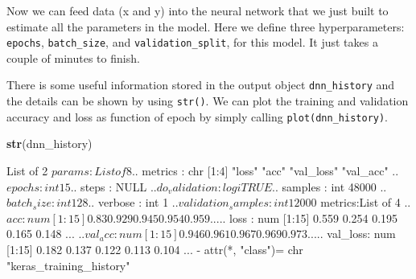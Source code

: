 \documentclass[12pt,]{krantz}
\makeatletter
\newenvironment{Shaded}{\begin{snugshade}}{\end{snugshade}}
\newcommand{\DataTypeTok}[1]{\textcolor[rgb]{0.27,0.27,0.27}{#1}}
\newcommand{\DecValTok}[1]{\textcolor[rgb]{0.06,0.06,0.06}{#1}}
\newcommand{\FloatTok}[1]{\textcolor[rgb]{0.06,0.06,0.06}{#1}}
\newcommand{\KeywordTok}[1]{\textcolor[rgb]{0.27,0.27,0.27}{\textbf{#1}}}
\newcommand{\NormalTok}[1]{#1}
\newcommand{\OperatorTok}[1]{\textcolor[rgb]{0.43,0.43,0.43}{\textbf{#1}}}
\newcommand{\StringTok}[1]{\textcolor[rgb]{0.5,0.5,0.5}{#1}}
\newenvironment{kframe}{%
\medskip{}
\setlength{\fboxsep}{.8em}
 \def\at@end@of@kframe{}%
 \ifinner\ifhmode%
  \def\at@end@of@kframe{\end{minipage}}%
  \begin{minipage}{\columnwidth}%
 \fi\fi%
 \def\FrameCommand##1{\hskip\@totalleftmargin \hskip-\fboxsep
 \colorbox{shadecolor}{##1}\hskip-\fboxsep
     \hskip-\linewidth \hskip-\@totalleftmargin \hskip\columnwidth}%
 \MakeFramed {\advance\hsize-\width
   \@totalleftmargin\z@ \linewidth\hsize
   \@setminipage}}%
 {\par\unskip\endMakeFramed%
 \at@end@of@kframe}
\renewenvironment{Shaded}{\begin{kframe}}{\end{kframe}}
\makeatother
\begin{document}
Now we can feed data (x and y) into the neural network that we just built to estimate all the parameters in the model. Here we define three hyperparameters: \texttt{epochs}, \texttt{batch\_size}, and \texttt{validation\_split}, for this model. It just takes a couple of minutes to finish.

\begin{Shaded}
\end{Shaded}

There is some useful information stored in the output object \texttt{dnn\_history} and the details can be shown by using \texttt{str()}. We can plot the training and validation accuracy and loss as function of epoch by simply calling \texttt{plot(dnn\_history)}.

\begin{Shaded}
\begin{Highlighting}[]
\KeywordTok{str}\NormalTok{(dnn_history)}
\end{Highlighting}
\end{Shaded}

\begin{Shaded}
\begin{Highlighting}[]
\NormalTok{List of 2}
\NormalTok{ $ params :List of 8}
\NormalTok{  ..$ metrics           : chr [1:4] "loss" "acc" "val_loss" "val_acc"}
\NormalTok{  ..$ epochs            : int 15}
\NormalTok{  ..$ steps             : NULL}
\NormalTok{  ..$ do_validation     : logi TRUE}
\NormalTok{  ..$ samples           : int 48000}
\NormalTok{  ..$ batch_size        : int 128}
\NormalTok{  ..$ verbose           : int 1}
\NormalTok{  ..$ validation_samples: int 12000}
\NormalTok{ $ metrics:List of 4}
\NormalTok{  ..$ acc     : num [1:15] 0.83 0.929 0.945 0.954 0.959 ...}
\NormalTok{  ..$ loss    : num [1:15] 0.559 0.254 0.195 0.165 0.148 ...}
\NormalTok{  ..$ val_acc : num [1:15] 0.946 0.961 0.967 0.969 0.973 ...}
\NormalTok{  ..$ val_loss: num [1:15] 0.182 0.137 0.122 0.113 0.104 ...}
\NormalTok{ - attr(*, "class")= chr "keras_training_history"}
\end{Highlighting}
\end{Shaded}
\end{document}
